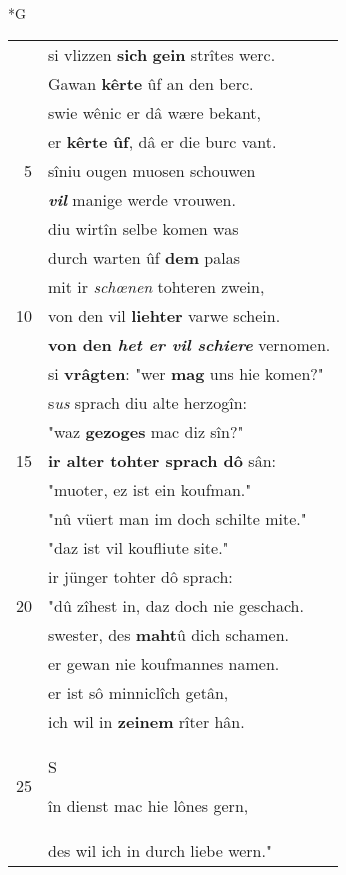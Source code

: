 \documentclass[8pt,a4paper,notitlepage]{article}
\begin{document}
\begin{table}[ht]
\begin{minipage}[t]{0.5\linewidth}
\small
\begin{center}*G
\end{center}
\begin{tabular}{rl}
 & si vlizzen \textbf{sich} \textbf{gein} strîtes werc.\\ 
 & Gawan \textbf{kêrte} ûf an den berc.\\ 
 & swie wênic er dâ wære bekant,\\ 
 & er \textbf{kêrte} \textbf{ûf}, dâ er die burc vant.\\ 
5 & sîniu ougen muosen schouwen\\ 
 & \textit{\textbf{vil}} manige werde vrouwen.\\ 
 & diu wirtîn selbe komen was\\ 
 & durch warten ûf \textbf{dem} palas\\ 
 & mit ir \textit{schœnen} tohteren zwein,\\ 
10 & von den vil \textbf{liehter} varwe schein.\\ 
 & \textbf{von den \textit{het er vil schiere}} vernomen.\\ 
 & si \textbf{vrâgten}: "wer \textbf{mag} uns hie komen?"\\ 
 & s\textit{us} sprach diu alte herzogîn:\\ 
 & "waz \textbf{gezoges} mac diz sîn?"\\ 
15 & \textbf{ir alter tohter sprach dô} sân:\\ 
 & "muoter, ez ist ein koufman."\\ 
 & "nû vüert man im doch schilte mite."\\ 
 & "daz ist vil koufliute site."\\ 
 & ir jünger tohter dô sprach:\\ 
20 & "dû zîhest in, daz doch nie geschach.\\ 
 & swester, des \textbf{maht}û dich schamen.\\ 
 & er gewan nie koufmannes namen.\\ 
 & er ist sô minniclîch getân,\\ 
 & ich wil in \textbf{zeinem} rîter hân.\\ 
25 & \begin{large}S\end{large}în dienst mac hie lônes gern,\\ 
 & des wil ich in durch liebe wern."\\ 

\end{tabular}
\end{minipage}
\end{table}
\end{document}
